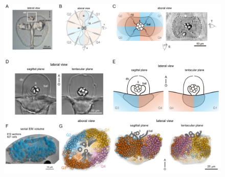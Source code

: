 \documentclass[
  11pt,
]{article}
\begin{document}
\begin{figure}[H]

{\centering \includegraphics{figures/Figure1.png}

}


\end{figure}
\end{document}
